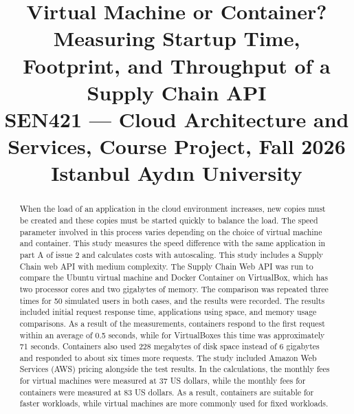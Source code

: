 \documentclass[conference,a4paper]{IEEEtran}
\begin{document}
\title{Virtual Machine or Container? Measuring Startup Time, Footprint, and Throughput of a Supply Chain API\\
	{\footnotesize SEN421 --- Cloud Architecture and Services, Course Project, Fall 2026\\
		Istanbul Ayd\i n University}
}

\author{
}

\maketitle

\begin{abstract}
When the load of an application in the cloud environment increases, new copies must be created and these copies must be started quickly to balance the load. The speed parameter involved in this process varies depending on the choice of virtual machine and container. This study measures the speed difference with the same application in part A of issue 2 and calculates costs with autoscaling. This study includes a Supply Chain web API with medium complexity. The Supply Chain Web API was run to compare the Ubuntu virtual machine and Docker Container on VirtualBox, which has two processor cores and two gigabytes of memory. The comparison was repeated three times for 50 simulated users in both cases, and the results were recorded. The results included initial request response time, applications using space, and memory usage comparisons. As a result of the measurements, containers respond to the first request within an average of 0.5 seconds, while for VirtualBoxes this time was approximately 71 seconds. Containers also used 228 megabytes of disk space instead of 6 gigabytes and responded to about six times more requests. The study included Amazon Web Services (AWS) pricing alongside the test results. In the calculations, the monthly fees for virtual machines were measured at 37 US dollars, while the monthly fees for containers were measured at 83 US dollars. As a result, containers are suitable for faster workloads, while virtual machines are more commonly used for fixed workloads.
\end{abstract}
\end{document}
